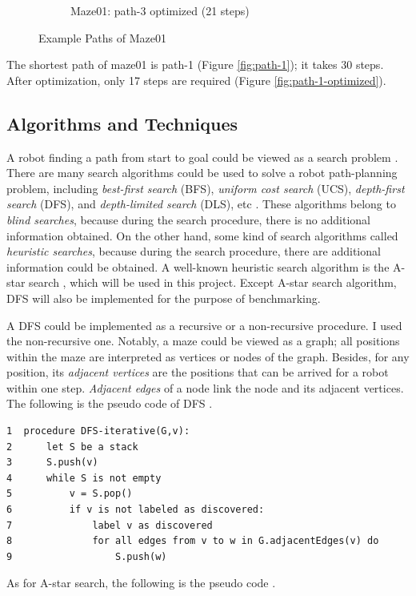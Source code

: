 \documentclass[11pt, oneside]{article}   	%
\begin{document}
\begin{figure}
\begin{subfigure}{7cm}
  \caption{Maze01: path-3 optimized (21 steps)}
  \label{fig:path-3-optimized}
\end{subfigure}
\caption{Example Paths of Maze01}
\label{fig:test}
\end{figure} 

The shortest path of maze01 is path-1 (Figure \ref{fig:path-1}); it takes 30 steps. After optimization, only 17 steps are required (Figure \ref{fig:path-1-optimized}).


\subsection{Algorithms and Techniques}
A robot finding a path from start to goal could be viewed as a search problem \cite{Russell-Norvig}. There are many search algorithms could be used to solve a robot path-planning problem, including {\it best-first search} (BFS), {\it uniform cost search} (UCS), {\it depth-first search} (DFS), and {\it depth-limited search} (DLS), etc \cite{G5AIAI}. These algorithms belong to {\it blind searches}, because during the search procedure, there is no additional information obtained. On the other hand, some kind of search algorithms called {\it heuristic searches}, because during the search procedure, there are additional information could be obtained. A well-known heuristic search algorithm is the A-star search \cite{Nilsson}, which will be used in this project. Except A-star search algorithm, DFS will also be implemented for the purpose of benchmarking.

A DFS could be implemented as a recursive or a non-recursive procedure. I used the non-recursive one. Notably, a maze could be viewed as a graph; all positions within the maze are interpreted as vertices or nodes of the graph. Besides, for any position, its {\it adjacent vertices} are the positions that can be arrived for a robot within one step. {\it Adjacent edges} of a node link the node and its adjacent vertices. The following is the pseudo code of DFS \cite{wikidfs}.

\begin{verbatim}
1  procedure DFS-iterative(G,v):
2      let S be a stack
3      S.push(v)
4      while S is not empty
5          v = S.pop()
6          if v is not labeled as discovered:
7              label v as discovered
8              for all edges from v to w in G.adjacentEdges(v) do
9                  S.push(w)
\end{verbatim}

As for A-star search, the following is the pseudo code \cite{Eranki}.
\end{document}
